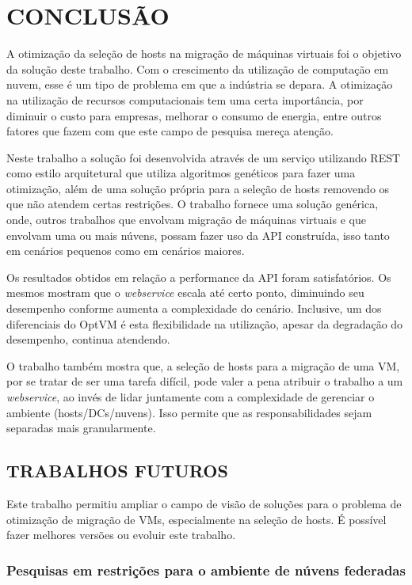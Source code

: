 \chapter{CONCLUSÃO}
\label{chap:conclusao}
A otimização da seleção de hosts na migração de máquinas virtuais
foi o objetivo da solução deste trabalho. Com o crescimento da 
utilização de computação em nuvem, esse é um tipo de problema em que
a indústria se depara. A otimização na utilização de recursos 
computacionais tem uma certa importância, por diminuir o custo para empresas,
melhorar o consumo de energia, entre outros fatores que fazem com que este
campo de pesquisa mereça atenção.

Neste trabalho a solução foi desenvolvida através de um serviço utilizando REST 
como estilo arquitetural que utiliza algoritmos genéticos para fazer uma otimização, 
além de uma solução própria para a seleção de hosts removendo os que não atendem
certas restrições. 
O trabalho fornece uma solução genérica, onde, outros trabalhos que 
envolvam migração de máquinas virtuais e que envolvam uma ou mais núvens, 
possam fazer uso da API construída, isso tanto em cenários pequenos como em 
cenários maiores.

Os resultados obtidos em relação a performance da API foram satisfatórios.
Os mesmos mostram que o \textit{webservice} escala até certo ponto, diminuindo
seu desempenho conforme aumenta a complexidade do cenário. Inclusive, um dos
diferenciais do OptVM é esta flexibilidade na utilização, apesar da degradação 
do desempenho, continua atendendo.

O trabalho também mostra que, a seleção de hosts para a migração de uma VM,
por se tratar de ser uma tarefa difícil, 
pode valer a pena atribuir o trabalho a um \textit{webservice}, ao invés de lidar 
juntamente com a complexidade de gerenciar o ambiente (hosts/DCs/nuvens). Isso permite
que as responsabilidades sejam separadas mais granularmente.

\section{TRABALHOS FUTUROS}
\label{sec:trabalhosFuturos}

Este trabalho permitiu ampliar o campo de visão de soluções para
o problema de otimização de migração de VMs, especialmente na seleção
de hosts. É possível fazer melhores versões ou evoluir este trabalho.

\subsection{Pesquisas em restrições para o ambiente de núvens federadas}

